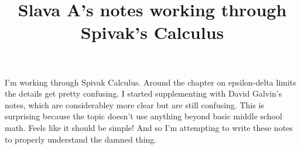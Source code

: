 \documentclass{article}
\title{Slava A's notes working through Spivak's Calculus}
\begin{document}
\maketitle

I'm working through Spivak Calculus. Around the chapter on
epsilon-delta limits the details get pretty confusing. I started
supplementing with David Galvin's notes, which are considerabley more
clear but are still confusing. This is surprising because the topic
doesn't use anything beyond basic middle school math. Feels like it
should be simple! And so I'm attempting to write these notes to
properly understand the damned thing.

\tableofcontents



\end{document}
